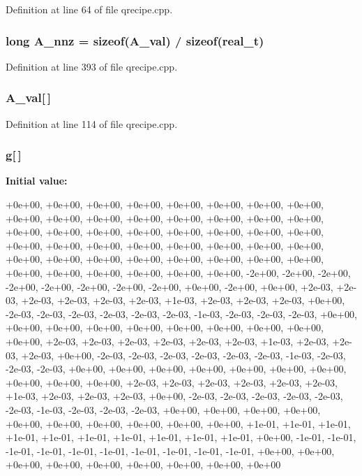 Definition at line 64 of file qrecipe.cpp.

\subsubsection[{A\_\-nnz}]{\setlength{\rightskip}{0pt plus 5cm}long {\bf A\_\-nnz} = sizeof({\bf A\_\-val}) / sizeof({\bf real\_\-t})}\label{qrecipe_8cpp_af3893418dbd5deb435193bc750024392}


Definition at line 393 of file qrecipe.cpp.

\subsubsection[{A\_\-val}]{ {\bf A\_\-val}[$\,$]}\label{qrecipe_8cpp_ae6ed341c558afe9d5ed2b97143908126}


Definition at line 114 of file qrecipe.cpp.

\subsubsection[{g}]{ {\bf g}[$\,$]}\label{qrecipe_8cpp_aaccc864902874c11795d0b5dcff64e15}
{\bfseries Initial value:}
\begin{DoxyCode}
 {+0e+00, +0e+00, +0e+00, +0e+00, +0e+00, +0e+00, +0e+00, +0e+00,
        +0e+00, +0e+00, +0e+00, +0e+00, +0e+00, +0e+00, +0e+00, +0e+00, +0e+00,
        +0e+00, +0e+00, +0e+00, +0e+00, +0e+00, +0e+00, +0e+00, +0e+00, +0e+00,
        +0e+00, +0e+00, +0e+00, +0e+00, +0e+00, +0e+00, +0e+00, +0e+00, +0e+00,
        +0e+00, +0e+00, +0e+00, +0e+00, +0e+00, +0e+00, +0e+00, +0e+00, +0e+00,
        +0e+00, +0e+00, -2e+00, -2e+00, -2e+00, -2e+00, -2e+00, -2e+00, -2e+00,
        -2e+00, +0e+00, -2e+00, +0e+00, +2e-03, +2e-03, +2e-03, +2e-03, +2e-03,
        +2e-03, +1e-03, +2e-03, +2e-03, +2e-03, +0e+00, -2e-03, -2e-03, -2e-03,
        -2e-03, -2e-03, -2e-03, -1e-03, -2e-03, -2e-03, -2e-03, +0e+00, +0e+00,
        +0e+00, +0e+00, +0e+00, +0e+00, +0e+00, +0e+00, +0e+00, +0e+00, +2e-03,
        +2e-03, +2e-03, +2e-03, +2e-03, +2e-03, +1e-03, +2e-03, +2e-03, +2e-03,
        +0e+00, -2e-03, -2e-03, -2e-03, -2e-03, -2e-03, -2e-03, -1e-03, -2e-03,
        -2e-03, -2e-03, +0e+00, +0e+00, +0e+00, +0e+00, +0e+00, +0e+00, +0e+00,
        +0e+00, +0e+00, +0e+00, +2e-03, +2e-03, +2e-03, +2e-03, +2e-03, +2e-03,
        +1e-03, +2e-03, +2e-03, +2e-03, +0e+00, -2e-03, -2e-03, -2e-03, -2e-03,
        -2e-03, -2e-03, -1e-03, -2e-03, -2e-03, -2e-03, +0e+00, +0e+00, +0e+00,
        +0e+00, +0e+00, +0e+00, +0e+00, +0e+00, +0e+00, +0e+00, +1e-01, +1e-01,
        +1e-01, +1e-01, +1e-01, +1e-01, +1e-01, +1e-01, +1e-01, +1e-01, +0e+00,
        -1e-01, -1e-01, -1e-01, -1e-01, -1e-01, -1e-01, -1e-01, -1e-01, -1e-01,
        -1e-01, +0e+00, +0e+00, +0e+00, +0e+00, +0e+00, +0e+00, +0e+00, +0e+00,
        +0e+00}
\end{DoxyCode}


